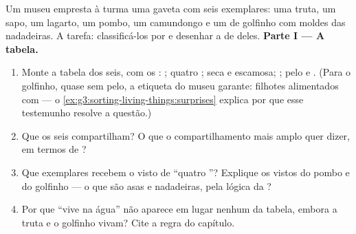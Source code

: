 \begin{problem}\label{pb:g6:classification-kinship:1}
Um museu empresta à turma uma gaveta com seis exemplares: uma truta,
um sapo, um lagarto, um pombo, um camundongo e um  de golfinho
com moldes das nadadeiras. A tarefa: classificá-los por  e
desenhar a  de  deles.
\medskip\noindent\textbf{Parte I --- A tabela.}
\begin{enumerate}
  \item Monte a tabela dos seis, com os : ;
        quatro ;  seca e escamosa; ; pelo e .
        (Para o golfinho, quase sem pelo, a etiqueta do museu
        garante: filhotes alimentados com  --- o
        \cref{ex:g3:sorting-living-things:surprises} explica por que
        esse testemunho resolve a questão.)
  \item Que  os seis compartilham? O que o compartilhamento
        mais amplo quer dizer, em termos de ?
  \item Que exemplares recebem o visto de ``quatro ''?
        Explique os vistos do pombo e do golfinho --- o que são asas e
        nadadeiras, pela lógica da ?
  \item Por que ``vive na água'' não aparece em lugar nenhum da
        tabela, embora a truta e o golfinho vivam? Cite a regra do
        capítulo.
\end{enumerate}


\end{problem}
